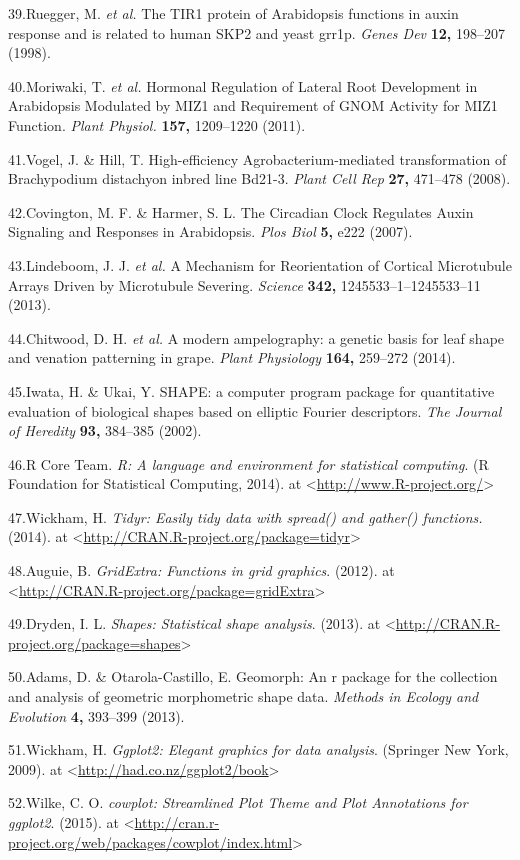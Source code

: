 \documentclass[]{article}
\begin{document}
39.Ruegger, M. \emph{et al.} The TIR1 protein of Arabidopsis functions
in auxin response and is related to human SKP2 and yeast grr1p.
\emph{Genes Dev} \textbf{12,} 198--207 (1998).

40.Moriwaki, T. \emph{et al.} Hormonal Regulation of Lateral Root
Development in Arabidopsis Modulated by MIZ1 and Requirement of GNOM
Activity for MIZ1 Function. \emph{Plant Physiol.} \textbf{157,}
1209--1220 (2011).

41.Vogel, J. \& Hill, T. High-efficiency Agrobacterium-mediated
transformation of Brachypodium distachyon inbred line Bd21-3.
\emph{Plant Cell Rep} \textbf{27,} 471--478 (2008).

42.Covington, M. F. \& Harmer, S. L. The Circadian Clock Regulates Auxin
Signaling and Responses in Arabidopsis. \emph{Plos Biol} \textbf{5,}
e222 (2007).

43.Lindeboom, J. J. \emph{et al.} A Mechanism for Reorientation of
Cortical Microtubule Arrays Driven by Microtubule Severing.
\emph{Science} \textbf{342,} 1245533--1--1245533--11 (2013).

44.Chitwood, D. H. \emph{et al.} A modern ampelography: a genetic basis
for leaf shape and venation patterning in grape. \emph{Plant Physiology}
\textbf{164,} 259--272 (2014).

45.Iwata, H. \& Ukai, Y. SHAPE: a computer program package for
quantitative evaluation of biological shapes based on elliptic Fourier
descriptors. \emph{The Journal of Heredity} \textbf{93,} 384--385
(2002).

46.R Core Team. \emph{R: A language and environment for statistical
computing}. (R Foundation for Statistical Computing, 2014). at
\textless{}\url{http://www.R-project.org/}\textgreater{}

47.Wickham, H. \emph{Tidyr: Easily tidy data with spread() and gather()
functions.} (2014). at
\textless{}\url{http://CRAN.R-project.org/package=tidyr}\textgreater{}

48.Auguie, B. \emph{GridExtra: Functions in grid graphics}. (2012). at
\textless{}\url{http://CRAN.R-project.org/package=gridExtra}\textgreater{}

49.Dryden, I. L. \emph{Shapes: Statistical shape analysis}. (2013). at
\textless{}\url{http://CRAN.R-project.org/package=shapes}\textgreater{}

50.Adams, D. \& Otarola-Castillo, E. Geomorph: An r package for the
collection and analysis of geometric morphometric shape data.
\emph{Methods in Ecology and Evolution} \textbf{4,} 393--399 (2013).

51.Wickham, H. \emph{Ggplot2: Elegant graphics for data analysis}.
(Springer New York, 2009). at
\textless{}\url{http://had.co.nz/ggplot2/book}\textgreater{}

52.Wilke, C. O. \emph{cowplot: Streamlined Plot Theme and Plot
Annotations for ggplot2}. (2015). at
\textless{}\url{http://cran.r-project.org/web/packages/cowplot/index.html}\textgreater{}
\end{document}
